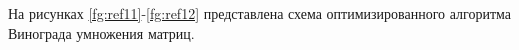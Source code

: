 \documentclass[12pt]{report}
\begin{document}
\begin{figure}[ht!]
\end{figure}

 На рисунках \ref{fg:ref11}-\ref{fg:ref12} представлена схема оптимизированного алгоритма Винограда умножения матриц.
\end{document}
